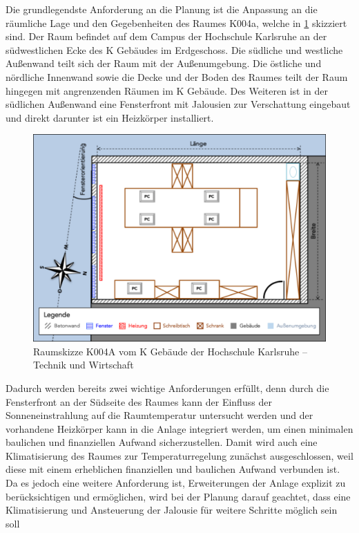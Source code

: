 Die grundlegendste Anforderung an die Planung ist die Anpassung an die räumliche Lage und den Gegebenheiten des Raumes K004a, welche in \ref{fig:skizzek004a} skizziert sind. 
Der Raum befindet auf dem Campus der Hochschule Karlsruhe an der südwestlichen Ecke des K Gebäudes im Erdgeschoss. Die südliche und westliche Außenwand teilt sich der Raum mit der Außenumgebung. Die östliche und nördliche Innenwand sowie die Decke und der Boden des Raumes teilt der Raum hingegen mit angrenzenden Räumen im K Gebäude. Des Weiteren ist in der südlichen Außenwand eine Fensterfront mit Jalousien zur Verschattung eingebaut und direkt darunter ist ein Heizkörper installiert.

\begin{figure}
\centering
\includegraphics[width=\textwidth]{abbildungen/20160102_k004a}
\caption[Raumskizze K004A vom K Gebäude der Hochschule Karlsruhe -- Technik und Wirtschaft]{Raumskizze K004A vom K Gebäude der Hochschule Karlsruhe -- Technik und Wirtschaft}
\label{fig:skizzek004a}
\end{figure}

Dadurch werden bereits zwei wichtige Anforderungen erfüllt, denn durch die Fensterfront an der Südseite des Raumes kann der Einfluss der Sonneneinstrahlung auf die Raumtemperatur untersucht werden und der vorhandene Heizkörper kann in die Anlage integriert werden, um einen minimalen baulichen und finanziellen Aufwand sicherzustellen.
Damit wird auch eine Klimatisierung des Raumes zur Temperaturregelung zunächst ausgeschlossen, weil diese mit einem erheblichen finanziellen und baulichen Aufwand verbunden ist. Da es jedoch eine weitere Anforderung ist, Erweiterungen der Anlage explizit zu berücksichtigen und ermöglichen, wird bei der Planung darauf geachtet, dass eine Klimatisierung und Ansteuerung der Jalousie für weitere Schritte möglich sein soll

